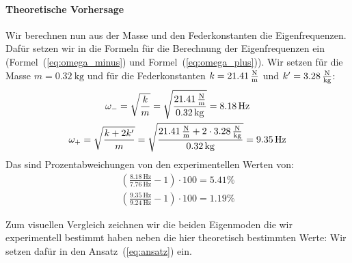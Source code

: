 \documentclass{article}
\begin{document}
              \paragraph{Theoretische Vorhersage}
                  Wir berechnen nun aus der Masse und den Federkonstanten die Eigenfrequenzen.
                  Dafür setzen wir in die Formeln für die Berechnung der Eigenfrequenzen ein (Formel~(\ref{eq:omega_minus}) und Formel~(\ref{eq:omega_plus})).
                  Wir setzen für die Masse \(m = \SI{0.32}{\kilogram} \) und für die Federkonstanten \(k = \SI{21.41}{\frac{\newton}{\metre}} \) und \(k' = \SI{3.28}{\frac{\newton}{\kilogram}} \):
                  \begin{equation}
                      \begin{gathered}
                          \omega_{-} = \sqrt{ \frac{k}{m} } = \sqrt{ \frac{ \SI{21.41}{\frac{\newton}{\metre}} }{ \SI{0.32}{\kilogram} } } = \SI{8.18}{\hertz} \\ %
                          \omega_{+} = \sqrt{ \frac{ k + 2 k' }{m} } = \sqrt{ \frac{ \SI{21.41}{\frac{\newton}{\metre}} + 2 \cdot \SI{3.28}{\frac{\newton}{\kilogram}} }{ \SI{0.32}{\kilogram} } } = \SI{9.35}{\hertz} \\ %
                      \end{gathered}
                  \end{equation}
                  Das sind Prozentabweichungen von den experimentellen Werten von:
                  \begin{equation}
                      \begin{gathered}
                          \left( \frac{ \SI{8.18}{\hertz} }{ \SI{7.76}{\hertz} } - 1 \right) \cdot 100 = 5.41 \% \\ %
                          \left( \frac{ \SI{9.35}{\hertz} }{ \SI{9.24}{\hertz} } - 1 \right) \cdot 100 = 1.19 \% %
                      \end{gathered}
                  \end{equation}

                  Zum visuellen Vergleich zeichnen wir die beiden Eigenmoden die wir experimentell bestimmt haben neben die hier theoretisch bestimmten Werte:
                  Wir setzen dafür in den Ansatz~(\ref{eq:ansatz}) ein.
\end{document}
